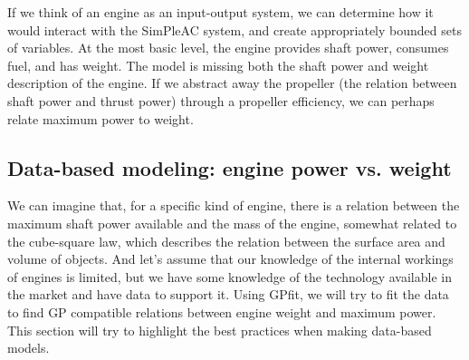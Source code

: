 If we think of an engine as an input-output system, we can determine how it
would interact with the SimPleAC system, and create appropriately bounded
sets of variables.
At the most basic level, the engine provides shaft power, consumes fuel,
and has weight. The model is missing both the shaft power and weight description
of the engine. If we abstract away the propeller (the relation between shaft
power and thrust power) through a propeller efficiency,
we can perhaps relate maximum power to weight.

\subsection{Data-based modeling: engine power vs. weight}
\label{s:datafit}

We can imagine that, for a specific kind of engine, there is a relation between the
maximum shaft power available and the mass of the engine, somewhat related to the
cube-square law, which describes the relation between the surface area and volume
of objects. And let's assume that our knowledge of the internal workings of engines
is limited, but we have some knowledge of the technology available in the market
and have data to support it. Using GPfit, we will try to fit the data to find
\gls{GP} compatible relations between engine weight and maximum power. This section
will try to highlight the best practices when making data-based models.

